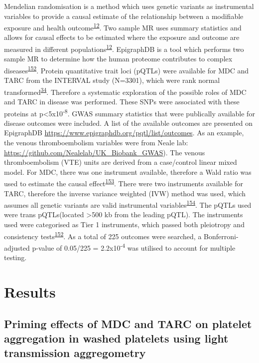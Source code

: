 \documentclass[11pt,twoside]{bristolthesis}
\begin{document}
Mendelian randomisation is a method which uses genetic variants as instrumental variables to provide a causal estimate of the relationship between a modifiable exposure and health outcome\textsuperscript{\protect\hyperlink{ref-Davies2018}{12}}. Two sample MR uses summary statistics and allows for causal effects to be estimated where the exposure and outcome are measured in different populations\textsuperscript{\protect\hyperlink{ref-Davies2018}{12}}. EpigraphDB is a tool which performs two sample MR to determine how the human proteome contributes to complex diseases\textsuperscript{\protect\hyperlink{ref-Zheng2020}{152}}. Protein quantitative trait loci (pQTLs) were available for MDC and TARC from the INTERVAL study (N=3301), which were rank normal transformed\textsuperscript{\protect\hyperlink{ref-Sun2018}{34}}. Therefore a systematic exploration of the possible roles of MDC and TARC in disease was performed. These SNPs were associated with these proteins at p\textless5x10\textsuperscript{-8}. GWAS summary statistics that were publically available for disease outcomes were included. A list of the available outcomes are presented on EpigraphDB \url{https://www.epigraphdb.org/pqtl/list/outcomes}. As an example, the venous thromboembolism variables were from Neale lab: \url{https://github.com/Nealelab/UK_Biobank_GWAS}). The venous thromboembolism (VTE) units are derived from a case/control linear mixed model. For MDC, there was one instrument available, therefore a Wald ratio was used to estimate the causal effect\textsuperscript{\protect\hyperlink{ref-Lawlor2008}{153}}. There were two instruments available for TARC, therefore the inverse variance weighted (IVW) method was used, which assumes all genetic variants are valid instrumental variables\textsuperscript{\protect\hyperlink{ref-Burgess2013}{154}}. The pQTLs used were trans pQTLs(located \textgreater500 kb from the leading pQTL). The instruments used were categorised as Tier 1 instruments, which passed both pleiotropy and consistency tests\textsuperscript{\protect\hyperlink{ref-Zheng2020}{152}}. As a total of 225 outcomes were searched, a Bonferroni-adjusted p-value of 0.05/225 = 2.2x10\textsuperscript{-4} was utilised to account for multiple testing.

\hypertarget{results-2}{%
\section{Results}\label{results-2}}

\hypertarget{priming-effects-of-mdc-and-tarc-on-platelet-aggregation-in-washed-platelets-using-light-transmission-aggregometry}{%
\subsection{Priming effects of MDC and TARC on platelet aggregation in washed platelets using light transmission aggregometry}\label{priming-effects-of-mdc-and-tarc-on-platelet-aggregation-in-washed-platelets-using-light-transmission-aggregometry}}
\end{document}
